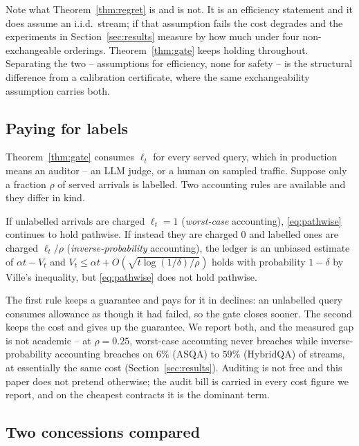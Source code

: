 Note what Theorem~\ref{thm:regret} is and is not. It is an efficiency
statement and it does assume an i.i.d.\ stream; if that assumption
fails the cost degrades and the experiments in
Section~\ref{sec:results} measure by how much under four
non-exchangeable orderings. Theorem~\ref{thm:gate} keeps holding
throughout. Separating the two -- assumptions for efficiency,
none for safety -- is the structural difference from a calibration
certificate, where the same exchangeability assumption carries both.

\subsection{Paying for labels}
\label{sec:labels}

Theorem~\ref{thm:gate} consumes $\ell_t$ for every served query, which
in production means an auditor -- an LLM judge, or a human on sampled
traffic. Suppose only a fraction $\rho$ of served arrivals is labelled.
Two accounting rules are available and they differ in kind.

\begin{proposition}
\label{prop:labels}
If unlabelled arrivals are charged $\ell_t = 1$ (\emph{worst-case}
accounting), \eqref{eq:pathwise} continues to hold pathwise. If instead
they are charged $0$ and labelled ones are charged $\ell_t/\rho$
(\emph{inverse-probability} accounting), the ledger is an unbiased
estimate of $\alpha t - V_t$ and $V_t \le \alpha t + O(\sqrt{t\log(1/\delta)/\rho})$
holds with probability $1-\delta$ by Ville's inequality, but
\eqref{eq:pathwise} does not hold pathwise.
\end{proposition}

The first rule keeps a guarantee and pays for it in declines: an
unlabelled query consumes allowance as though it had failed, so the gate
closes sooner. The second keeps the cost and gives up the guarantee. We
report both, and the measured gap is not academic -- at $\rho = 0.25$,
worst-case accounting never breaches while inverse-probability
accounting breaches on $6\%$ (ASQA) to $59\%$ (HybridQA) of streams,
at essentially the same cost (Section~\ref{sec:results}). Auditing is
not free and this paper does not pretend otherwise; the audit bill is
carried in every cost figure we report, and on the cheapest contracts it
is the dominant term.

\subsection{Two concessions compared}
\label{sec:width}


